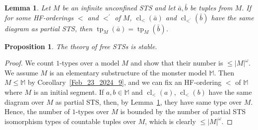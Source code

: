\documentclass[10pt,a4paper]{article}
\DeclareMathOperator{\cl}{cl}
\DeclareMathOperator{\tp}{tp}
\newcommand{\mons}{\mathbb{M}}
\theoremstyle{note}
\newtheorem{lemma}[thm]{Lemma}
\newtheorem{prop}[thm]{Proposition}
\begin{document}
	\begin{lemma}\label{elementary2}
		Let $M$ be an infinite unconfined STS and let $\bar{a},\bar{b}$ be tuples from $M$. If for some HF-orderings $<$ and $<^\prime$  of $M$,  $\cl_<(\bar{a})$ and $\cl_{<^\prime}(\bar{b})$ have the same diagram as partial STS, then  $\tp_M(\bar{a})=\tp_M(\bar{b})$.
	\end{lemma}

	\begin{prop}\label{stable} The theory of free STSs  is stable.
	\end{prop}

	\begin{proof}  We count  $1$-types over a model $M$ and show that their number is $\leq |M|^\omega$. We assume $M$ is an elementary substructure of the monster model $\mons$. Then  $M\leq \mons$ by  Corollary~\ref{Feb_23_2024_9}, and we can fix an HF-ordering $<$ of $\mons$ where $M$ is an initial segment. If $a,b \in \mons$ and $\cl_<(a)$, $\cl_<(b)$ have the same diagram over $M$ as partial STS, then, by Lemma~\ref{elementary2}, they have same type over $M$.
	Hence, the number of $1$-types over $M$ is bounded by the number of partial STS isomorphism types of countable tuples over $M$, which is clearly $\leq |M|^\omega$.
	\end{proof}
\end{document}
